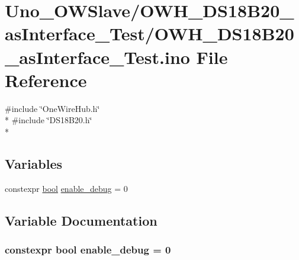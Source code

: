 \hypertarget{OWH__DS18B20__asInterface__Test_8ino}{\section{Uno\-\_\-\-O\-W\-Slave/\-O\-W\-H\-\_\-\-D\-S18\-B20\-\_\-as\-Interface\-\_\-\-Test/\-O\-W\-H\-\_\-\-D\-S18\-B20\-\_\-as\-Interface\-\_\-\-Test.ino File Reference}
\label{OWH__DS18B20__asInterface__Test_8ino}
}
{\ttfamily \#include \char`\"{}One\-Wire\-Hub.\-h\char`\"{}}\\*
{\ttfamily \#include \char`\"{}D\-S18\-B20.\-h\char`\"{}}\\*
\subsection*{Variables}
\begin{DoxyCompactItemize}
\item 
constexpr \hyperlink{stdbool_8h_abb452686968e48b67397da5f97445f5b}{bool} \hyperlink{OWH__DS18B20__asInterface__Test_8ino_a10e1cfbd99adf655995798f1db9bfbed}{enable\-\_\-debug} = 0
\end{DoxyCompactItemize}


\subsection{Variable Documentation}
\hypertarget{OWH__DS18B20__asInterface__Test_8ino_a10e1cfbd99adf655995798f1db9bfbed}{
\subsubsection[{enable\-\_\-debug}]{\setlength{\rightskip}{0pt plus 5cm}constexpr {\bf bool} enable\-\_\-debug = 0}}\label{OWH__DS18B20__asInterface__Test_8ino_a10e1cfbd99adf655995798f1db9bfbed}
